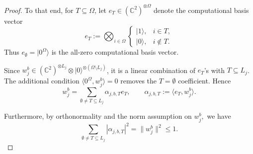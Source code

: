\documentclass[12pt]{article}
\newcommand{\C}{\mathbb{C}}
\begin{document}
\begin{appendix}
\begin{proof}
To that end, for \(T\subseteq\Omega\), let \(e_T\in(\C^2)^{\otimes \Omega}\) denote the
computational basis vector
\[
e_T
:=
\bigotimes_{i\in\Omega}
\begin{cases}
|1\rangle, & i\in T,\\
|0\rangle, & i\notin T.
\end{cases}
\]
Thus \(e_\emptyset=|0^\Omega\rangle\) is the all-zero computational basis vector.

Since \(w_j^b\in(\C^2)^{\otimes L_j}
\otimes |0\rangle^{\otimes(\Omega\setminus L_j)}\), it is a linear combination
of \(e_T\)'s with \(T\subseteq L_j\). The additional condition
\(\langle 0^\Omega,w_j^b\rangle=0\) removes the \(T=\emptyset\) coefficient.
Hence
\[
w_j^b
=
\sum_{\emptyset\neq T\subseteq L_j}
\alpha_{j,b,T} e_T, \qquad \alpha_{j,b,T} := \langle e_T, w_j^b \rangle.
\]

Furthermore, by orthonormality and the norm assumption on \(w_j^b,\) we have
\[
\sum_{\emptyset\neq T\subseteq L_j}
|\alpha_{j,b,T}|^2
=
\|w_j^b\|^2
\le 1.
\]


\end{proof}
\end{appendix}
\end{document}
